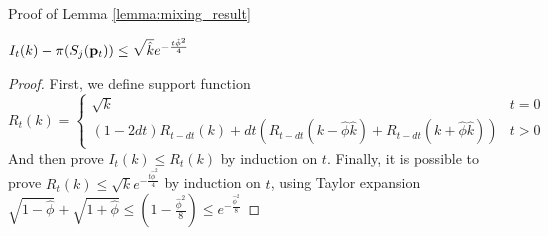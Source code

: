\documentclass[../main.tex]{subfiles}
\begin{document}
	\begin{frame}{Proof of Lemma \ref{lemma:mixing_result}}
		\begin{lemma}
			$I_t(k) - \pi(S_j(\bold{p}_{t})) \leq \sqrt{\hat{k}} e^{-\frac{t\hat{\phi}^2}{4}}$
		\end{lemma}
		\begin{proof}
			First, we define support function $$R_t(k) = \begin{cases} \sqrt{k} & t=0 \\ (1-2dt)R_{t-dt}(k) + dt(R_{t-dt}(k-\hat{\phi}\hat{k}) + R_{t-dt}(k+\hat{\phi}\hat{k})) & t>0
			\end{cases}$$
			And then prove $I_t(k)\leq R_t(k)$ by induction on $t$. Finally, it is possible to prove $R_t(k) \leq \sqrt{k}e^{-\frac{t\hat{\phi}^2}{4}}$ by induction on $t$, using Taylor expansion $\sqrt{1-\hat{\phi}}+\sqrt{1+\hat{\phi}} \leq (1-\frac{\hat{\phi}^2}{8}) \leq e^{-\frac{\hat{\phi}^2}{8}}$
		\end{proof}
	\end{frame}
\end{document}
